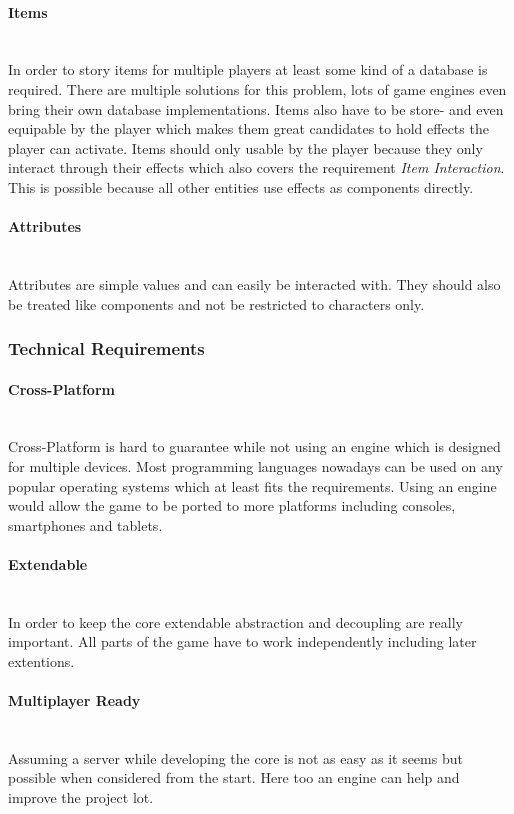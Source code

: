\documentclass[11pt]{article}
\begin{document}
\paragraph{Items}~\\
In order to story items for multiple players at least some kind of a database is required. There are multiple solutions for this problem, lots of game engines even bring their own database implementations.
Items also have to be store- and even equipable by the player which makes them great candidates to hold effects the player can activate. Items should only usable by the player because they only interact through their effects which also covers the requirement \textit{Item Interaction}. 
This is possible because all other entities use effects as components directly.
\paragraph{Attributes}~\\
Attributes are simple values and can easily be interacted with.
They should also be treated like components and not be restricted to characters only.

\subsubsection{Technical Requirements}
\paragraph{Cross-Platform}~\\
Cross-Platform is hard to guarantee while not using an engine which is designed for multiple devices. Most programming languages nowadays can be used on any popular operating systems which at least fits the requirements.
Using an engine would allow the game to be ported to more platforms including consoles, smartphones and tablets.
\paragraph{Extendable}~\\
In order to keep the core extendable abstraction and decoupling are really important. All parts of the game have to work independently including later extentions.
\paragraph{Multiplayer Ready}~\\
Assuming a server while developing the core is not as easy as it seems but possible when considered from the start.
Here too an engine can help and improve the project lot.
\end{document}

